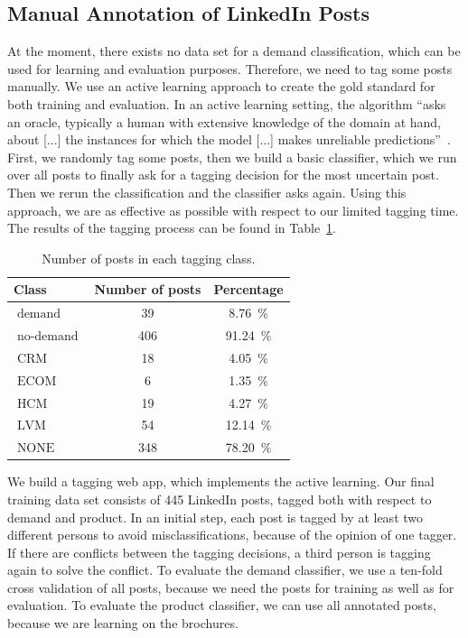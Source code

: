 \subsection{Manual Annotation of LinkedIn Posts}

At the moment, there exists no data set for a demand classification, which can be used for learning and evaluation purposes.
Therefore, we need to tag some posts manually.
We use an active learning approach to create the gold standard for both training and evaluation.
In an active learning setting, the algorithm ``asks an oracle, typically a human with extensive knowledge of the domain at hand, about [...] the instances for which the model [...] makes unreliable predictions''~\cite{olsson2009literature}.
First, we randomly tag some posts, then we build a basic classifier, which we run over all posts to finally ask for a tagging decision for the most uncertain post.
Then we rerun the classification and the classifier asks again.
Using this approach, we are as effective as possible with respect to our limited tagging time.
The results of the tagging process can be found in Table~\ref{table:data_overview}.

\begin{table}[h]
	\centering
	\begin{tabular}{lcc}
		\hline
		\textbf{Class} & \textbf{Number of posts} & \textbf{Percentage} \\
		\hline
		\hline
		$\operatorname{demand}$ & 39 & 8.76~\% \\
		\hline
		$\operatorname{no-demand}$ & 406 & 91.24~\% \\
		\hline
		\hline
		$\operatorname{CRM}$ & 18 & 4.05~\% \\
		\hline
		$\operatorname{ECOM}$ & 6 & 1.35~\% \\
		\hline
		$\operatorname{HCM}$ & 19 & 4.27~\% \\
		\hline
		$\operatorname{LVM}$ & 54 & 12.14~\% \\
		\hline
		$\operatorname{NONE}$ & 348 & 78.20~\% \\
		\hline
	\end{tabular}
	\caption{Number of posts in each tagging class.}
	\label{table:data_overview}
\end{table}

We build a tagging web app, which implements the active learning.
Our final training data set consists of 445 LinkedIn posts, tagged both with respect to demand and product.
In an initial step, each post is tagged by at least two different persons to avoid misclassifications, because of the opinion of one tagger.
If there are conflicts between the tagging decisions, a third person is tagging again to solve the conflict.
To evaluate the demand classifier, we use a ten-fold cross validation of all posts, because we need the posts for training as well as for evaluation.
To evaluate the product classifier, we can use all annotated posts, because we are learning on the brochures.

